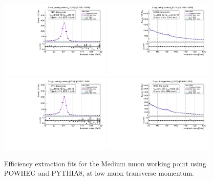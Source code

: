 {\begin{figure}
\centering
\includegraphics[width=0.49\textwidth]{figures/Zmm_PowhegPythia_BkgLPi_pass_ptBin0_etaBin1.pdf}
\includegraphics[width=0.49\textwidth]{figures/Zmm_PowhegPythia_BkgLPi_fail_ptBin0_etaBin1.pdf}
\includegraphics[width=0.49\textwidth]{figures/Zmm_PowhegPythia_BkgLPi_pass_ptBin1_etaBin9.pdf}
\includegraphics[width=0.49\textwidth]{figures/Zmm_PowhegPythia_BkgLPi_fail_ptBin1_etaBin9.pdf}
\caption{Efficiency extraction fits for the Medium muon working point using POWHEG and PYTHIA8, at low muon transverse momentum.}
\label{fig:ZmmAltSigFSRFits1}
\end{figure}
\begin{figure}

\end{figure}}

